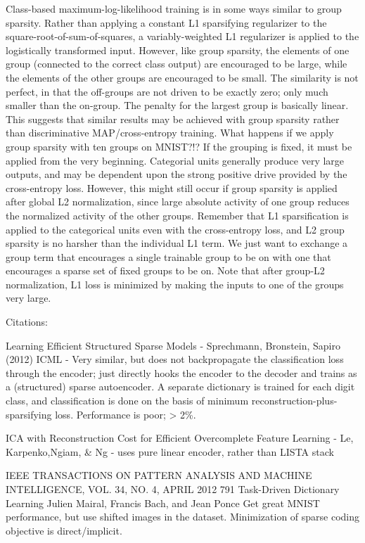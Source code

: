 Class-based maximum-log-likelihood training is in some ways similar to group sparsity.  Rather than applying a constant L1 sparsifying regularizer to the square-root-of-sum-of-squares, a variably-weighted L1 regularizer is applied to the logistically transformed input.  However, like group sparsity, the elements of one group (connected to the correct class output) are encouraged to be large, while the elements of the other groups are encouraged to be small.  The similarity is not perfect, in that the off-groups are not driven to be exactly zero; only much smaller than the on-group.  The penalty for the largest group is basically linear.  This suggests that similar results may be achieved with group sparsity rather than discriminative MAP/cross-entropy training.  What happens if we apply group sparsity with ten groups on MNIST?!?  If the grouping is fixed, it must be applied from the very beginning.  Categorial units generally produce very large outputs, and may be dependent upon the strong positive drive provided by the cross-entropy loss.  However, this might still occur if group sparsity is applied after global L2 normalization, since large absolute activity of one group reduces the normalized activity of the other groups.  Remember that L1 sparsification is applied to the categorical units even with the cross-entropy loss, and L2 group sparsity is no harsher than the individual L1 term.  We just want to exchange a group term that encourages a single trainable group to be on with one that encourages a sparse set of fixed groups to be on.  Note that after group-L2 normalization, L1 loss is minimized by making the inputs to one of the groups very large.




Citations:

Learning Efficient Structured Sparse Models - Sprechmann, Bronstein, Sapiro (2012) ICML - Very similar, but does not backpropagate the classification loss through the encoder; just directly hooks the encoder to the decoder and trains as a (structured) sparse autoencoder.  A separate dictionary is trained for each digit class, and classification is done on the basis of minimum reconstruction-plus-sparsifying loss.  Performance is poor; > 2\%.  

ICA with Reconstruction Cost for Efficient Overcomplete Feature Learning - Le, Karpenko,Ngiam, \& Ng - uses pure linear encoder, rather than LISTA stack

IEEE TRANSACTIONS ON PATTERN ANALYSIS AND MACHINE INTELLIGENCE, VOL. 34, NO. 4, APRIL 2012 791
Task-Driven Dictionary Learning Julien Mairal, Francis Bach, and Jean Ponce
Get great MNIST performance, but use shifted images in the dataset.  Minimization of sparse coding objective is direct/implicit.

